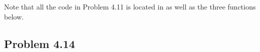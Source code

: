 \documentclass[../hw_sols.tex]{subfiles}
\begin{document}
\vspace{0.5cm}


\begin{solution}
Note that all the code in Problem 4.11 is located in  
as well as the three functions below.


\end{solution}


\newpage



\subsection*{Problem 4.14}
\end{document}
